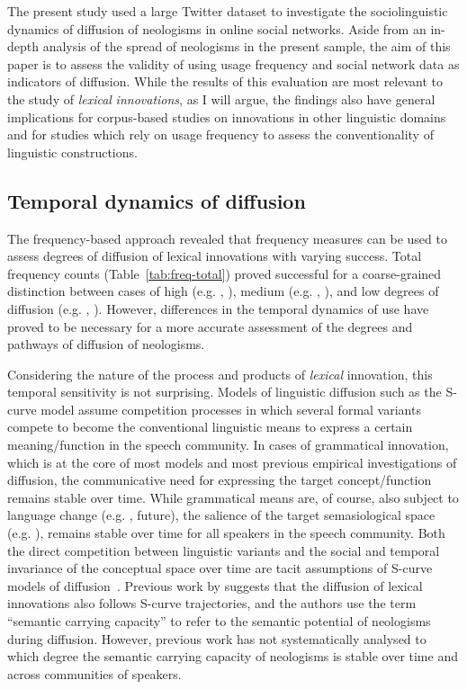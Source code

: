 \documentclass[
  a4paper,
  abstract=on,
  captions=tableabove
  ]{scrartcl}
\begin{document}
  The present study used a large Twitter dataset to investigate the sociolinguistic dynamics of diffusion of neologisms in online social networks. Aside from an in-depth analysis of the spread of neologisms in the present sample, the aim of this paper is to assess the validity of using usage frequency and social network data as indicators of diffusion. While the results of this evaluation are most relevant to the study of \emph{lexical} \emph{innovations}, as I will argue, the findings also have general implications for corpus-based studies on innovations in other linguistic domains and for studies which rely on usage frequency to assess the conventionality of linguistic constructions.

  \subsection{Temporal dynamics of diffusion}

    The frequency-based approach revealed that frequency measures can be used to assess degrees of diffusion of lexical innovations with varying success. Total frequency counts (Table~\ref{tab:freq-total}) proved successful for a coarse-grained distinction between cases of high (e.g. , ), medium (e.g. , ), and low degrees of diffusion (e.g. , ). However, differences in the temporal dynamics of use have proved to be necessary for a more accurate assessment of the degrees and pathways of diffusion of neologisms.

    Considering the nature of the process and products of \emph{lexical} innovation, this temporal sensitivity is not surprising. Models of linguistic diffusion such as the S-curve model assume competition processes in which several formal variants compete to become the conventional linguistic means to express a certain meaning/function in the speech community. In cases of grammatical innovation, which is at the core of most models and most previous empirical investigations of diffusion, the communicative need for expressing the target concept/function remains stable over time. While grammatical means are, of course, also subject to language change (e.g. ,  future), the salience of the target semasiological space (e.g. ), remains stable over time for all speakers in the speech community. Both the direct competition between linguistic variants and the social and temporal invariance of the conceptual space over time are tacit assumptions of S-curve models of diffusion~\parencite{Blythe2012ScurvesMechanisms}. Previous work by \cite{Nini2017ApplicationGrowth} suggests that the diffusion of lexical innovations also follows S-curve trajectories, and the authors use the term \enquote{semantic carrying capacity} to refer to the semantic potential of neologisms during diffusion. However, previous work has not systematically analysed to which degree the semantic carrying capacity of neologisms is stable over time and across communities of speakers.
\end{document}
